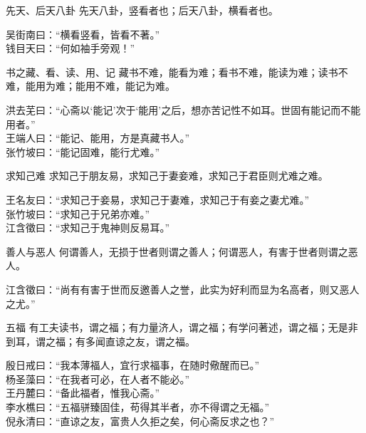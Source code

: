\begin{yulu}{先天、后天八卦}
先天八卦，竖看者也；后天八卦，横看者也。
\begin{comments}
吴街南曰：“横看竖看，皆看不著。” \\
钱目天曰：“何如袖手旁观！”
\end{comments}
\end{yulu}

\begin{yulu}{书之藏、看、读、用、记}
藏书不难，能看为难；看书不难，能读为难；读书不难，能用为难；能用不难，能记为难。
\begin{comments}
洪去芜曰：“心斋以‘能记’次于‘能用’之后，想亦苦记性不如耳。世固有能记而不能用者。” \\
王端人曰：“能记、能用，方是真藏书人。” \\
张竹坡曰：“能记固难，能行尤难。”
\end{comments}
\end{yulu}

\begin{yulu}{求知己难}
求知己于朋友易，求知己于妻妾难，求知己于君臣则尤难之难。
\begin{comments}
王名友曰：“求知己于妾易，求知己于妻难，求知己于有妾之妻尤难。” \\
张竹坡曰：“求知己于兄弟亦难。” \\
江含徵曰：“求知己于鬼神则反易耳。”
\end{comments}
\end{yulu}

\begin{yulu}{善人与恶人}
何谓善人，无损于世者则谓之善人；何谓恶人，有害于世者则谓之恶人。
\begin{comments}
江含徵曰：“尚有有害于世而反邀善人之誉，此实为好利而显为名高者，则又恶人之尤。”
\end{comments}
\end{yulu}

\begin{yulu}{五福}
有工夫读书，谓之福；有力量济人，谓之福；有学问著述，谓之福；无是非到耳，谓之福；有多闻直谅之友，谓之福。
\begin{comments}
殷日戒曰：“我本薄福人，宜行求福事，在随时儆醒而已。” \\
杨圣藻曰：“在我者可必，在人者不能必。” \\
王丹麓曰：“备此福者，惟我心斋。” \\
李水樵曰：“五福骈臻固佳，苟得其半者，亦不得谓之无福。” \\
倪永清曰：“直谅之友，富贵人久拒之矣，何心斋反求之也？”
\end{comments}
\end{yulu}

